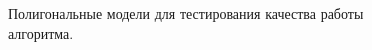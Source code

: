 \begin{figure}[h]
    \caption{Полигональные модели для тестирования качества работы алгоритма.}
    \label{fig:polygonal models}
\end{figure}


